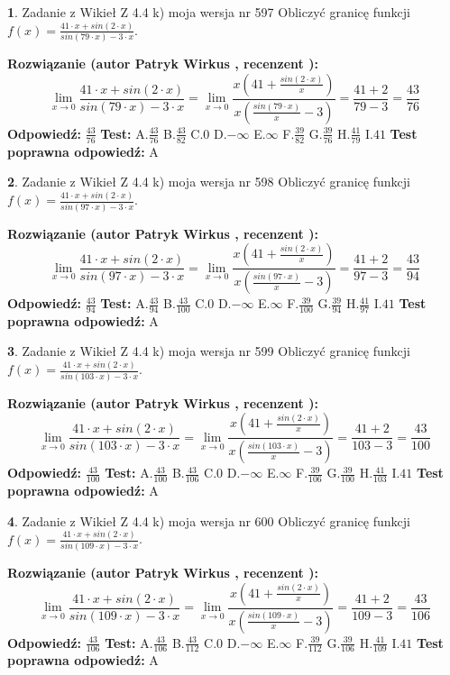 \documentclass[12pt, a4paper]{article}
\theoremstyle{definition} %
\newtheorem{zad}{}
\newcommand{\zadStart}[1]{\begin{zad}#1\newline}
\newcommand{\zadStop}{\end{zad}}
\newcommand{\rozwStart}[2]{\noindent \textbf{Rozwiązanie (autor #1 , recenzent #2): }\newline}
\newcommand{\rozwStop}{\newline}
\newcommand{\odpStart}{\noindent \textbf{Odpowiedź:}\newline}
\newcommand{\odpStop}{\newline}
\newcommand{\testStart}{\noindent \textbf{Test:}\newline}
\newcommand{\testStop}{\newline}
\newcommand{\kluczStart}{\noindent \textbf{Test poprawna odpowiedź:}\newline}
\newcommand{\kluczStop}{\newline}
\begin{document}
\zadStart{Zadanie z Wikieł Z 4.4 k) moja wersja nr 597}
Obliczyć granicę funkcji $f(x)=\frac{41\cdot x +sin(2\cdot x)}{sin(79\cdot x) -3\cdot x}$.
\zadStop
\rozwStart{Patryk Wirkus}{}
$$\lim\limits_{x\to 0}\frac{41\cdot x +sin(2\cdot x)}{sin(79\cdot x) -3\cdot x}
=\lim\limits_{x\to 0}\frac{x(41+\frac{sin(2\cdot x)}{x})}{x(\frac{sin(79\cdot x)}{x}-3)}
=\frac{41+2}{79-3} = \frac{43}{76}$$
\rozwStop
\odpStart
$\frac{43}{76}$
\odpStop
\testStart
A.$\frac{43}{76}$
B.$\frac{43}{82}$
C.$0$
D.$-\infty$
E.$\infty$
F.$\frac{39}{82}$
G.$\frac{39}{76}$
H.$\frac{41}{79}$
I.$41$
\testStop
\kluczStart
A
\kluczStop



\zadStart{Zadanie z Wikieł Z 4.4 k) moja wersja nr 598}
Obliczyć granicę funkcji $f(x)=\frac{41\cdot x +sin(2\cdot x)}{sin(97\cdot x) -3\cdot x}$.
\zadStop
\rozwStart{Patryk Wirkus}{}
$$\lim\limits_{x\to 0}\frac{41\cdot x +sin(2\cdot x)}{sin(97\cdot x) -3\cdot x}
=\lim\limits_{x\to 0}\frac{x(41+\frac{sin(2\cdot x)}{x})}{x(\frac{sin(97\cdot x)}{x}-3)}
=\frac{41+2}{97-3} = \frac{43}{94}$$
\rozwStop
\odpStart
$\frac{43}{94}$
\odpStop
\testStart
A.$\frac{43}{94}$
B.$\frac{43}{100}$
C.$0$
D.$-\infty$
E.$\infty$
F.$\frac{39}{100}$
G.$\frac{39}{94}$
H.$\frac{41}{97}$
I.$41$
\testStop
\kluczStart
A
\kluczStop



\zadStart{Zadanie z Wikieł Z 4.4 k) moja wersja nr 599}
Obliczyć granicę funkcji $f(x)=\frac{41\cdot x +sin(2\cdot x)}{sin(103\cdot x) -3\cdot x}$.
\zadStop
\rozwStart{Patryk Wirkus}{}
$$\lim\limits_{x\to 0}\frac{41\cdot x +sin(2\cdot x)}{sin(103\cdot x) -3\cdot x}
=\lim\limits_{x\to 0}\frac{x(41+\frac{sin(2\cdot x)}{x})}{x(\frac{sin(103\cdot x)}{x}-3)}
=\frac{41+2}{103-3} = \frac{43}{100}$$
\rozwStop
\odpStart
$\frac{43}{100}$
\odpStop
\testStart
A.$\frac{43}{100}$
B.$\frac{43}{106}$
C.$0$
D.$-\infty$
E.$\infty$
F.$\frac{39}{106}$
G.$\frac{39}{100}$
H.$\frac{41}{103}$
I.$41$
\testStop
\kluczStart
A
\kluczStop



\zadStart{Zadanie z Wikieł Z 4.4 k) moja wersja nr 600}
Obliczyć granicę funkcji $f(x)=\frac{41\cdot x +sin(2\cdot x)}{sin(109\cdot x) -3\cdot x}$.
\zadStop
\rozwStart{Patryk Wirkus}{}
$$\lim\limits_{x\to 0}\frac{41\cdot x +sin(2\cdot x)}{sin(109\cdot x) -3\cdot x}
=\lim\limits_{x\to 0}\frac{x(41+\frac{sin(2\cdot x)}{x})}{x(\frac{sin(109\cdot x)}{x}-3)}
=\frac{41+2}{109-3} = \frac{43}{106}$$
\rozwStop
\odpStart
$\frac{43}{106}$
\odpStop
\testStart
A.$\frac{43}{106}$
B.$\frac{43}{112}$
C.$0$
D.$-\infty$
E.$\infty$
F.$\frac{39}{112}$
G.$\frac{39}{106}$
H.$\frac{41}{109}$
I.$41$
\testStop
\kluczStart
A
\kluczStop
\end{document}
